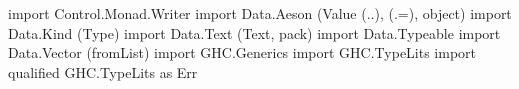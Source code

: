 \begin{code}
import Control.Monad.Writer
import Data.Aeson (Value (..), (.=), object)
import Data.Kind (Type)
import Data.Text (Text, pack)
import Data.Typeable
import Data.Vector (fromList)
import GHC.Generics
import GHC.TypeLits
import qualified GHC.TypeLits as Err
\end{code}
